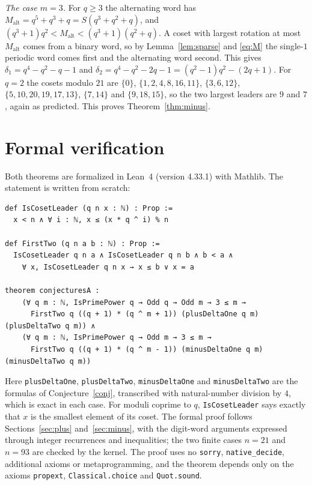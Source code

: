 \documentclass[11pt]{amsart}
\theoremstyle{remark}
\begin{document}
\emph{The case $m=3$.}
For $q\ge3$ the alternating word has $M_{\mathrm{alt}}=q^5+q^3+q=S(q^3+q^2+q)$, and $(q^3+1)q^2<M_{\mathrm{alt}}<(q^3+1)(q^2+q)$.
A coset with largest rotation at most $M_{\mathrm{alt}}$ comes from a binary word, so by Lemma~\ref{lem:sparse} and \eqref{eq:M} the single-$1$ periodic word comes first and the alternating word second.
This gives $\delta_1=q^4-q^2-q-1$ and $\delta_2=q^4-q^2-2q-1=(q^2-1)q^2-(2q+1)$.
For $q=2$ the cosets modulo $21$ are $\{0\}$, $\{1,2,4,8,16,11\}$, $\{3,6,12\}$, $\{5,10,20,19,17,13\}$, $\{7,14\}$ and $\{9,18,15\}$, so the two largest leaders are $9$ and $7$, again as predicted.
This proves Theorem~\ref{thm:minus}.

\section{Formal verification}\label{sec:lean}

Both theorems are formalized in Lean~4 (version 4.33.1) with Mathlib.
The statement is written from scratch:
\begin{Verbatim}[fontsize=\small,frame=single]
def IsCosetLeader (q n x : ℕ) : Prop :=
  x < n ∧ ∀ i : ℕ, x ≤ (x * q ^ i) % n

def FirstTwo (q n a b : ℕ) : Prop :=
  IsCosetLeader q n a ∧ IsCosetLeader q n b ∧ b < a ∧
    ∀ x, IsCosetLeader q n x → x ≤ b ∨ x = a

theorem conjecturesA :
    (∀ q m : ℕ, IsPrimePower q → Odd q → Odd m → 3 ≤ m →
      FirstTwo q ((q + 1) * (q ^ m + 1)) (plusDeltaOne q m) (plusDeltaTwo q m)) ∧
    (∀ q m : ℕ, IsPrimePower q → Odd m → 3 ≤ m →
      FirstTwo q ((q + 1) * (q ^ m - 1)) (minusDeltaOne q m) (minusDeltaTwo q m))
\end{Verbatim}
Here \texttt{plusDeltaOne}, \texttt{plusDeltaTwo}, \texttt{minusDeltaOne} and \texttt{minusDeltaTwo} are the formulas of Conjecture~\ref{conj}, transcribed with natural-number division by $4$, which is exact in each case.
For moduli coprime to $q$, \texttt{IsCosetLeader} says exactly that $x$ is the smallest element of its coset.
The formal proof follows Sections~\ref{sec:plus} and~\ref{sec:minus}, with the digit-word arguments expressed through integer recurrences and inequalities; the two finite cases $n=21$ and $n=93$ are checked by the kernel.
The proof uses no \texttt{sorry}, \texttt{native\_decide}, additional axioms or metaprogramming, and the theorem depends only on the axioms \texttt{propext}, \texttt{Classical.choice} and \texttt{Quot.sound}.
\end{document}
